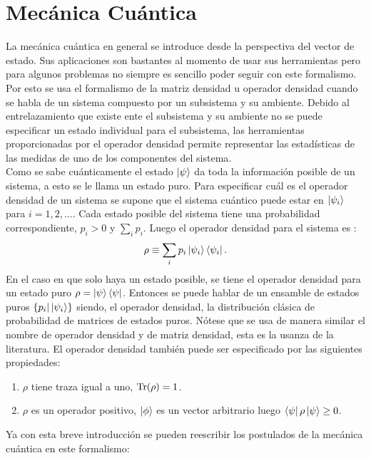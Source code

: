\section{Mecánica Cuántica}
La mecánica cuántica en general se introduce desde la perspectiva del vector de estado. Sus aplicaciones son bastantes al momento de usar sus herramientas pero para algunos problemas no siempre es sencillo poder seguir con este formalismo. Por esto se usa el formalismo de la matriz densidad u operador densidad cuando se habla de un sistema compuesto por un subsistema y su ambiente. Debido al entrelazamiento que existe ente el subsistema y su ambiente no se puede especificar un estado individual para el subsistema, las herramientas proporcionadas por el operador densidad permite representar las estadísticas de las medidas de uno de los componentes del sistema.
\\
Como se sabe cuánticamente el estado $\ket{\psi}$ da toda la información posible de un sistema, a esto se le llama un estado puro. Para especificar cuál es el operador densidad de un sistema se supone que el sistema cuántico puede estar en $\ket{\psi_{i}}$ para $i=1,2,...$. Cada estado posible del sistema tiene una probabilidad correspondiente, $p_{i}>0$ y $\sum_{i} p_{i}$. Luego el operador densidad para el sistema es :
\begin{equation}
\rho \equiv \sum_{i} p_{i} \ket{\psi_{i}}\bra{\psi_{i}}.
\end{equation}
En el caso en que solo haya un estado posible, se tiene el operador densidad para un estado puro $\rho= \ket{\psi}\bra{\psi}$. Entonces se puede hablar de un ensamble de estados puros $ \{ p_{i} | \ket{\psi_{i}} \} $  siendo, el operador densidad, la distribución clásica de probabilidad de matrices de estados puros. Nótese que se usa de manera similar el nombre de operador densidad y de matriz densidad, esta es la usanza de la literatura. El operador densidad también puede ser especificado por las siguientes propiedades: 

\begin{enumerate}
\item $\rho$ tiene traza igual a uno, $\Tr(\rho)=1$.

\item $\rho$ es un operador positivo, $\ket{\phi}$ es un vector arbitrario luego $\bra{\psi}\rho\ket{\psi} \geq 0$.
\end{enumerate}
Ya con esta breve introducción se pueden reescribir los postulados de la mecánica cuántica en este formalismo:
\\

